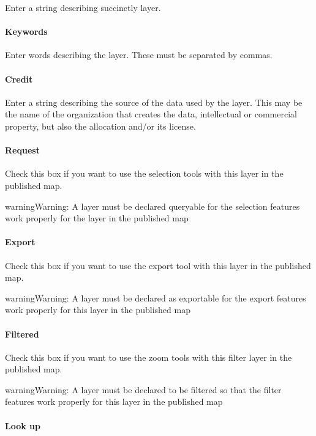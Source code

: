 \documentclass[letterpaper,10pt,english]{sphinxmanual}
\begin{document}
Enter a string describing succinctly layer.
\paragraph{Keywords}

Enter words describing the layer. These must be separated by commas.
\paragraph{Credit}

Enter a string describing the source of the data used by the layer. This may be the name of the organization that creates the data, intellectual or commercial property, but also the allocation and/or its license.
\paragraph{Request}

Check this box if you want to use the selection tools with this layer in the published map.

\begin{notice}{warning}{Warning:}
A layer must be declared queryable for the selection features work properly for the layer in the published map
\end{notice}
\paragraph{Export}

Check this box if you want to use the export tool with this layer in the published map.

\begin{notice}{warning}{Warning:}
A layer must be declared as exportable for the export features work properly for this layer in the published map
\end{notice}
\paragraph{Filtered}

Check this box if you want to use the zoom tools with this filter layer in the published map.

\begin{notice}{warning}{Warning:}
A layer must be declared to be filtered so that the filter features work properly for this layer in the published map
\end{notice}
\paragraph{Look up}
\end{document}
